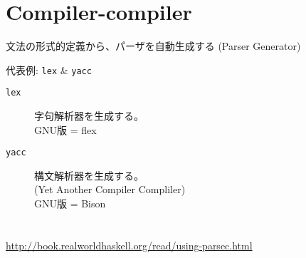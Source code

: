 \documentclass[slide,papersize,fleqn,22pt]{jsarticle}
\begin{document}
\section{Compiler-compiler}
文法の形式的定義から、パーザを自動生成する (Parser Generator)

代表例: \texttt{lex} \& \texttt{yacc}
\begin{description}
\item[\texttt{lex}] 字句解析器を生成する。\\
  GNU版 = flex
\item[\texttt{yacc}] 構文解析器を生成する。 \\
  (Yet Another Compiler Compliler) \\
  GNU版 = Bison
\end{description}

\section{}
\url{http://book.realworldhaskell.org/read/using-parsec.html}
\end{document}
